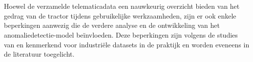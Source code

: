 


\section{}%
\label{sec: uitdagingen bij het bekomen dataset}

Hoewel de verzamelde telematicadata een nauwkeurig overzicht bieden van het gedrag van de tractor tijdens gebruikelijke werkzaamheden, zijn er ook enkele beperkingen aanwezig die de verdere analyse en de ontwikkeling van het anomaliedet\-ectie-model beïnvloeden. Deze beperkingen zijn volgens de studies van \textcite{Elahi2023} en \textcite{Mahale2025} kenmerkend voor industriële datasets in de praktijk en worden eveneens in de literatuur toegelicht.

